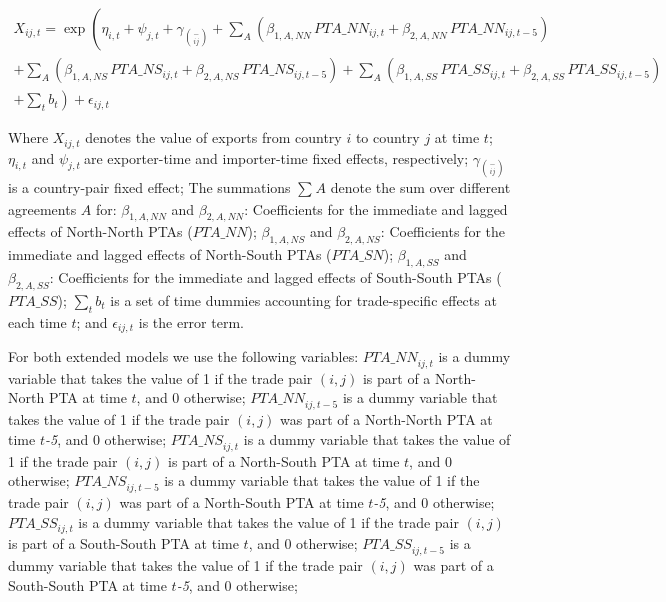 \documentclass[12pt]{article}%
\begin{document}
\begin{multline}
    X_{ij,t} = \exp\left(\eta_{i,t} + \psi_{j,t} + \gamma_{\binom{-}{ij}} + \sum_{A}\left(\beta_{1,A,NN} \, PTA\_NN_{ij,t} + \beta_{2,A,NN} \, PTA\_NN_{ij,t-5}\right) \right. \\
    + \sum_{A}\left(\beta_{1,A,NS} \, PTA\_NS_{ij,t} + \beta_{2,A,NS} \, PTA\_NS_{ij,t-5}\right) + \sum_{A}\left(\beta_{1,A,SS} \, PTA\_SS_{ij,t} + \beta_{2,A,SS} \, PTA\_SS_{ij,t-5}\right) \\
    + \left. \sum_{t} b_{t} \right) + \epsilon_{ij,t}
\end{multline}

Where \(X_{ij,t}\)\hspace{0pt} denotes the value of exports from country
\(i\) to country \(j\) at time \(t\); \(\eta_{i,t}\) and
\(\psi_{j,t}\ \)are exporter-time and importer-time fixed effects,
respectively; \(\gamma_{\binom{-}{ij}}\) is a country-pair fixed effect;
The summations \hspace{0pt}\(\sum_{}^{}A\) denote the sum over different
agreements \(A\) for: \(\beta_{1,A,NN}\) and \(\beta_{2,A,NN}\):
Coefficients for the immediate and lagged effects of North-North PTAs
\hspace{0pt}(\(PTA\_ NN\)); \(\beta_{1,A,NS}\) and \(\beta_{2,A,NS}\):
Coefficients for the immediate and lagged effects of North-South PTAs
(\(PTA\_ SN\)); \(\beta_{1,A,SS}\) and \(\beta_{2,A,SS}\): Coefficients
for the immediate and lagged effects of South-South PTAs (\(PTA\_ SS\));
\(\sum_{t}^{}b_{t}\) is a set of time dummies accounting for
trade-specific effects at each time \(t\); and \(\epsilon_{ij,t}\) is
the error term.

For both extended models we use the following variables:
\({PTA\_ NN}_{ij,t}\) is a dummy variable that takes the value of 1 if
the trade pair \((i,j)\) is part of a North-North PTA at time \(t\), and
0 otherwise; \({PTA\_ NN}_{ij,t - 5}\) is a dummy variable that takes
the value of 1 if the trade pair \((i,j)\) was part of a North-North PTA
at time \(t\)\emph{-5}, and 0 otherwise; \({PTA\_ NS}_{ij,t}\) is a
dummy variable that takes the value of 1 if the trade pair \((i,j)\) is
part of a North-South PTA at time \(t\), and 0 otherwise;
\({PTA\_ NS}_{ij,t - 5}\) is a dummy variable that takes the value of 1
if the trade pair \((i,j)\) was part of a North-South PTA at time
\(t\)\emph{-5}, and 0 otherwise; \({PTA\_ SS}_{ij,t}\) is a dummy
variable that takes the value of 1 if the trade pair \((i,j)\) is part
of a South-South PTA at time \(t\), and 0 otherwise;
\({PTA\_ SS}_{ij,t - 5}\) is a dummy variable that takes the value of 1
if the trade pair \((i,j)\) was part of a South-South PTA at time
\(t\)\emph{-5}, and 0 otherwise;
\end{document}
